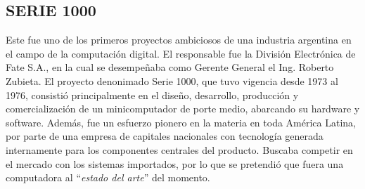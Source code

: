 \documentclass[%
 	final,
%
	notitlepage,
	narroweqnarray,
	inline,
 	twoside,
	]{ieee}
\begin{document}
\subsection*{SERIE 1000}
Este fue uno de los primeros proyectos ambiciosos de una industria argentina en el campo de la computaci\'on digital. El responsable fue la Divisi\'on Electr\'onica de Fate S.A., en la cual se desempe\~naba como Gerente General el Ing. Roberto Zubieta.
El proyecto denonimado Serie 1000, que tuvo vigencia desde 1973 al 1976, consisti\'o principalmente en el dise\~no, desarrollo, producci\'on y comercializaci\'on de un minicomputador de porte medio, abarcando su hardware y software. Adem\'as, fue un esfuerzo pionero en la materia en toda Am\'erica Latina, por parte de una empresa de capitales nacionales con tecnolog\'ia generada internamente para los componentes centrales del producto. Buscaba competir en el mercado con los sistemas importados, por lo que se pretendi\'o que fuera una computadora al ``\textit{estado del arte}'' del momento.
\end{document}

